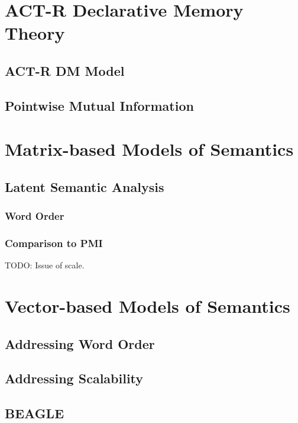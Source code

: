\documentclass[man]{apa6}
\begin{document}
\section{ACT-R Declarative Memory Theory}

\subsection{ACT-R DM Model}

\subsection{Pointwise Mutual Information}

\section{Matrix-based Models of Semantics}

\subsection{Latent Semantic Analysis}

\subsubsection{Word Order}

\subsubsection{Comparison to PMI}

TODO: Issue of scale.

\section{Vector-based Models of Semantics}

\subsection{Addressing Word Order}

\subsection{Addressing Scalability}

\subsection{BEAGLE}
\end{document}
